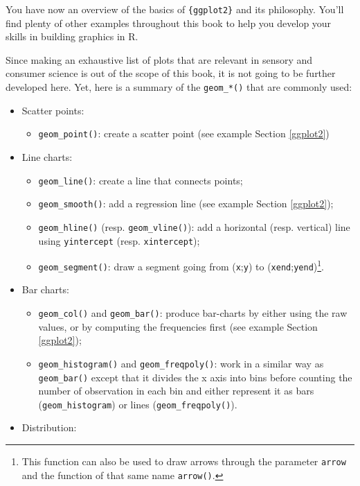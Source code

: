 \documentclass[
]{krantz}
\providecommand{\tightlist}{%
  \setlength{\itemsep}{0pt}\setlength{\parskip}{0pt}}
\begin{document}
You have now an overview of the basics of \texttt{\{ggplot2\}} and its philosophy. You'll find plenty of other examples throughout this book to help you develop your skills in building graphics in R.

Since making an exhaustive list of plots that are relevant in sensory and consumer science is out of the scope of this book, it is not going to be further developed here. Yet, here is a summary of the \texttt{geom\_*()} that are commonly used:

\begin{itemize}
\tightlist
\item
  Scatter points:

  \begin{itemize}
  \tightlist
  \item
    \texttt{geom\_point()}: create a scatter point (see example Section \ref{ggplot2})
  \end{itemize}
\item
  Line charts:

  \begin{itemize}
  \tightlist
  \item
    \texttt{geom\_line()}: create a line that connects points;
  \item
    \texttt{geom\_smooth()}: add a regression line (see example Section \ref{ggplot2});
  \item
    \texttt{geom\_hline()} (resp. \texttt{geom\_vline()}): add a horizontal (resp. vertical) line using \texttt{yintercept} (resp. \texttt{xintercept});
  \item
    \texttt{geom\_segment()}: draw a segment going from (\texttt{x};\texttt{y}) to (\texttt{xend};\texttt{yend})\footnote{This function can also be used to draw arrows through the parameter \texttt{arrow} and the function of that same name \texttt{arrow()}.}.
  \end{itemize}
\item
  Bar charts:

  \begin{itemize}
  \tightlist
  \item
    \texttt{geom\_col()} and \texttt{geom\_bar()}: produce bar-charts by either using the raw values, or by computing the frequencies first (see example Section \ref{ggplot2});
  \item
    \texttt{geom\_histogram()} and \texttt{geom\_freqpoly()}: work in a similar way as \texttt{geom\_bar()} except that it divides the x axis into bins before counting the number of observation in each bin and either represent it as bars (\texttt{geom\_histogram}) or lines (\texttt{geom\_freqpoly()}).
  \end{itemize}
\item
  Distribution:


\end{itemize}
\end{document}
